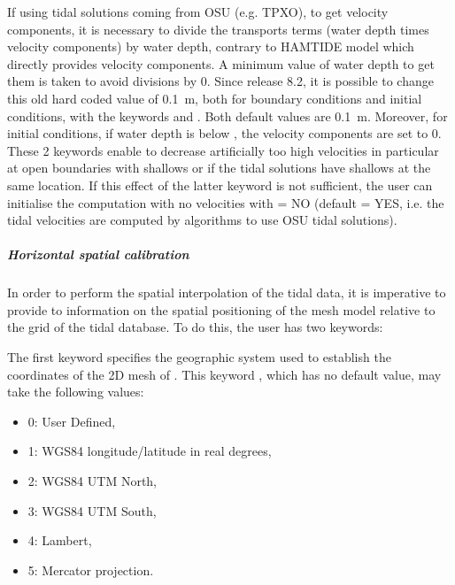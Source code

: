 If using tidal solutions coming from OSU (e.g. TPXO), to get velocity
components, it is necessary to divide the transports terms
(water depth times velocity components) by water depth,
contrary to HAMTIDE model which directly provides velocity components.
A minimum value of water depth to get them is taken to avoid divisions by 0.
Since release 8.2, it is possible to change this old hard coded value of 0.1~m,
both for boundary conditions and initial conditions, with the keywords
 and
.
Both default values are 0.1~m.
Moreover, for initial conditions, if water depth is below
,
the velocity components are set to 0.
These 2 keywords enable to decrease artificially too high velocities
in particular at open boundaries with shallows or if the tidal solutions
have shallows at the same location.
If this effect of the latter keyword is not sufficient,
the user can initialise the computation with no velocities with
 = NO (default = YES, i.e. the
tidal velocities are computed by algorithms to use OSU tidal solutions).


\subparagraph{Horizontal spatial calibration}

In order to perform the spatial interpolation of the tidal data,
it is imperative to provide to  information on the spatial
positioning of the mesh model relative to the grid of the tidal database.
To do this, the user has two keywords:

The first keyword specifies the geographic system used to establish the
coordinates of the 2D mesh of .
This keyword , which has no default value,
may take the following values:

\begin{itemize}
\item 0: User Defined,

\item 1: WGS84 longitude/latitude in real degrees,

\item 2: WGS84 UTM North,

\item 3: WGS84 UTM South,

\item 4: Lambert,

\item 5: Mercator projection.
\end{itemize}

